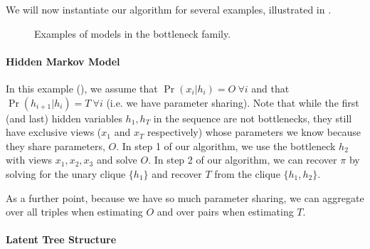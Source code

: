 We will now instantiate our algorithm for several examples, illustrated in .

\begin{figure}
  \caption{Examples of models in the bottleneck family.}
  \label{fig:examples}
\end{figure}

\paragraph{Hidden Markov Model}

In this example (), we assume that
  $\Pr(x_i|h_i) = O  ~\forall i$  and that $\Pr(h_{i+1} | h_i)
  = T ~\forall i$ (i.e. we have parameter sharing).
Note that while the first (and last) hidden variables $h_1, h_T$ in the
  sequence are not bottlenecks, they still have exclusive views ($x_1$ and
  $x_T$ respectively) whose parameters we know because they share
  parameters, $O$.
In step 1 of our algorithm, we use the bottleneck $h_2$ with views $x_1,
  x_2, x_3$ and solve $O$.
In step 2 of our algorithm, we can recover $\pi$ by solving for the
  unary clique $\{h_1\}$ and recover $T$ from the clique $\{h_{1},
  h_{2}\}$.

As a further point, because we have so much parameter sharing, we can
  aggregate over all triples when estimating $O$ and over pairs when
  estimating $T$.

\paragraph{Latent Tree Structure}

